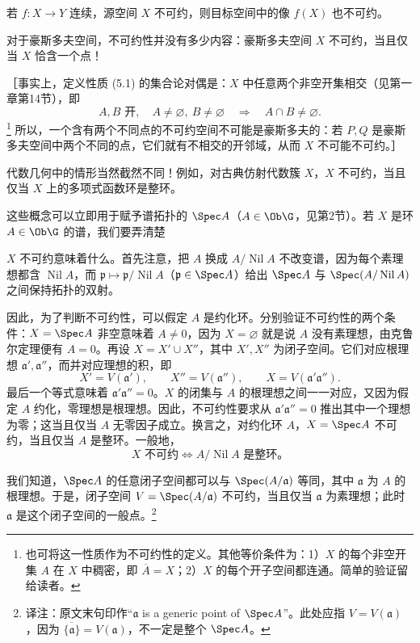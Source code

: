 若 $f:X\to Y$ 连续，源空间 $X$ 不可约，则目标空间中的像 $f(X)$ 也不可约。

对于豪斯多夫空间，不可约性并没有多少内容：豪斯多夫空间 $X$ 不可约，当且仅当 $X$ 恰含一个点！

［事实上，定义性质 (5.1) 的集合论对偶是：$X$ 中任意两个非空开集相交（见第一章第14节），即
\[
A,B\text{ 开},\quad A\ne\varnothing,\ B\ne\varnothing
\quad\Longrightarrow\quad A\cap B\ne\varnothing.
\]
\footnote{也可将这一性质作为不可约性的定义。其他等价条件为：1）$X$ 的每个非空开集 $A$ 在 $X$ 中稠密，即 $\overline A=X$；2）$X$ 的每个开子空间都连通。简单的验证留给读者。}
所以，一个含有两个不同点的不可约空间不可能是豪斯多夫的：若 $P,Q$ 是豪斯多夫空间中两个不同的点，它们就有不相交的开邻域，从而 $X$ 不可能不可约。］

代数几何中的情形当然截然不同！例如，对古典仿射代数簇 $X$，$X$ 不可约，当且仅当 $X$ 上的多项式函数环是整环。

这些概念可以立即用于赋予谱拓扑的 $\Spec A$（$A\in\Ob\G$，见第2节）。若 $X$ 是环 $A\in\Ob\G$ 的谱，我们要弄清楚

$X$ 不可约意味着什么。首先注意，把 $A$ 换成 $A/\operatorname{Nil}A$ 不改变谱，因为每个素理想都含 $\operatorname{Nil}A$，而 $\mathfrak p\mapsto\mathfrak p/\operatorname{Nil}A$（$\mathfrak p\in\Spec A$）给出 $\Spec A$ 与 $\Spec(A/\operatorname{Nil}A)$ 之间保持拓扑的双射。

因此，为了判断不可约性，可以假定 $A$ 是约化环。分别验证不可约性的两个条件：$X=\Spec A$ 非空意味着 $A\ne0$，因为 $X=\varnothing$ 就是说 $A$ 没有素理想，由克鲁尔定理便有 $A=0$。再设 $X=X'\cup X''$，其中 $X',X''$ 为闭子空间。它们对应根理想 $\mathfrak a',\mathfrak a''$，而并对应理想的积，即
\[
X'=V(\mathfrak a'),\qquad X''=V(\mathfrak a''),\qquad
X=V(\mathfrak a'\mathfrak a'').
\]
最后一个等式意味着 $\mathfrak a'\mathfrak a''=0$。$X$ 的闭集与 $A$ 的根理想之间一一对应，又因为假定 $A$ 约化，零理想是根理想。因此，不可约性要求从 $\mathfrak a'\mathfrak a''=0$ 推出其中一个理想为零；这当且仅当 $A$ 无零因子成立。换言之，对约化环 $A$，$X=\Spec A$ 不可约，当且仅当 $A$ 是整环。一般地，
\[
\boxed{\quad X\text{ 不可约}\iff A/\operatorname{Nil}A\text{ 是整环。}\quad}
\]

我们知道，$\Spec A$ 的任意闭子空间都可以与 $\Spec(A/\mathfrak a)$ 等同，其中 $\mathfrak a$ 为 $A$ 的根理想。于是，闭子空间 $V=\Spec(A/\mathfrak a)$ 不可约，当且仅当 $\mathfrak a$ 为素理想；此时 $\mathfrak a$ 是这个闭子空间的一般点。\footnote{译注：原文末句印作“$\mathfrak a$ is a generic point of $\Spec A$”。此处应指 $V=V(\mathfrak a)$，因为 $\overline{\{\mathfrak a\}}=V(\mathfrak a)$，不一定是整个 $\Spec A$。}

